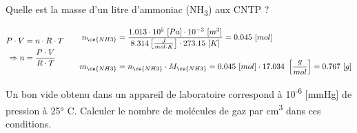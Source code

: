 \documentclass[
  11pt,
  a4paper,
  openany]{book}
\begin{document}
\newpage

\begin{Exercise}

Quelle est la masse d'un litre d'ammoniac (NH\textsubscript{3}) aux CNTP ?


\end{Exercise}

\begin{Answer}
\[
\begin{split}
    P \cdot V &= n \cdot R \cdot T \\
    \Rightarrow n &= \frac{P \cdot V}{R \cdot T}
\end{split}
\qquad
\begin{split}
    n_{\ce{NH3}} &= \frac{1.013 \cdot 10^{5}\ [Pa] \cdot 10^{-3}\ [m^3]}{8.314 \left[\frac{J}{mol \cdot K}\right] \cdot 273.15\ [K]} = 0.045\ [mol] \\[1em]
    m_{\ce{NH3}} &= n_{\ce{NH3}} \cdot M_{\ce{NH3}} = 0.045\ [mol] \cdot 17.034\ \left[\frac{g}{mol}\right] = 0.767\ [g]
\end{split}
\]

\end{Answer}

\begin{Exercise}

Un bon vide obtenu dans un appareil de laboratoire correspond à 10\textsuperscript{-6} {[}mmHg{]} de pression à 25° C. Calculer le nombre de molécules de gaz par cm\textsuperscript{3} dans ces conditions.


\end{Exercise}
\end{document}
